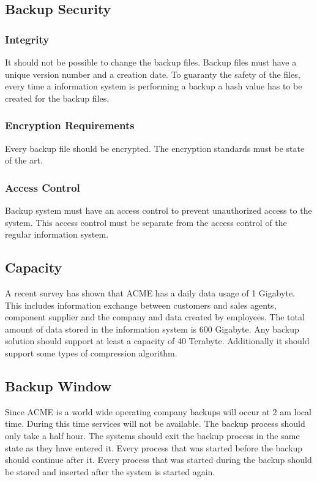 \subsection{Backup Security}

\subsubsection{Integrity}
It should not be possible to change the backup files. Backup files must
have a unique version number and a creation date. To guaranty the safety
of the files, every time a information system is performing a backup a
hash value has to be created for the backup files.  

\subsubsection{Encryption Requirements}
Every backup file should be encrypted. The encryption standards must be
state of the art.  

\subsubsection{Access Control}

Backup system must have an access control to prevent unauthorized access
to the system. This access control must be separate from the access
control of the regular information system.  

\subsection{Capacity}

A recent survey has shown that ACME has a daily data usage of 1
Gigabyte. This includes information exchange between customers and sales
agents, component supplier and the company and data created by
employees. The total amount of data stored in the information system is
600 Gigabyte. Any backup solution should support at least a capacity of
40 Terabyte. Additionally it should support some types of compression
algorithm.  

\subsection{Backup Window}

Since ACME is a world wide operating company backups will occur at 2 am
local time. During this time services will not be available. The backup
process should only take a half hour. The systems should exit the backup
process in the same state as they have entered it. Every process that
was started before the backup should continue after it. Every process
that was started during the backup should be stored and inserted after
the system is started again.

